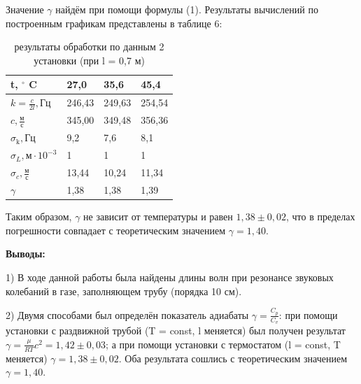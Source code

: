 \documentclass[a4paper,11pt]{extarticle} %
\begin{document}
	Значение $\gamma$ найдём при помощи формулы (1). Результаты вычислений по построенным графикам представлены в таблице 6:
	\begin{table}[ht!]
	\begin{center}
	\begin{tabular}{|l|l|l|l|}
		\hline
		t, $^\circ$ C & 27,0 & 35,6 & 45,4
		\\
		
		\hline
		$k = \frac{c}{2l},{\text{Гц}}$ & 246,43 & 249,63 & 254,54 
		\\
		\hline
		$c,\frac{\text{м}}{\text{с}}$ & 345,00 & 349,48 & 356,36 
		\\
		\hline
		$\sigma_{\text{k}},{\text{Гц}} $ & 9,2 & 7,6 & 8,1 
		\\
		\hline
		$\sigma_{L},{\text{м}} \cdot 10^{-3} $ & 1 & 1 & 1  
		\\
		\hline
		$\sigma_{c},\frac{\text{м}}{\text{с}}$ & 13,44 & 10,24 & 11,34 
		\\
		\hline
		$\gamma$ & 1,38 & 1,38 & 1,39
		\\
		\hline
	\end{tabular}
	\caption{результаты обработки по данным 2 установки (при l = 0,7 м)}
	\end{center}
    \end{table}
    
	Таким образом, $\gamma$ не зависит от температуры и равен $1,38 \pm 0,02$, что в пределах погрешности совпадает  с теоретическим значением $\gamma = 1,40 .$

	
	
\textbf{Выводы:}

	1) В ходе данной работы была найдены длины волн при резонансе звуковых колебаний
в газе, заполняющем трубу (порядка 10 см).

    2) Двумя способами был определён показатель адиабаты $\gamma = \frac{C_p}{C_v}$: при помощи установки с раздвижной трубой (T = const, l меняется) был получен результат $\gamma=\frac{\mu}{RT} c^2 = 1,42 \pm 0,03$; а при помощи установки с термостатом (l = const, T меняется) $\gamma = 1,38 \pm 0,02$. Оба результата сошлись с теоретическим значением $\gamma = 1,40$.
	

	
\end{document}
